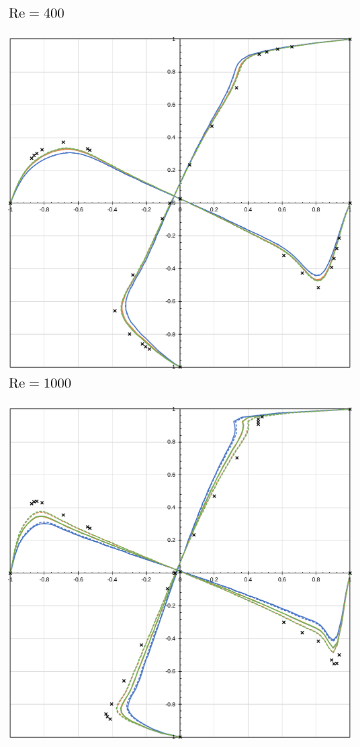 \begin{figure}[h!]
\begin{subfigure}{0.4\textwidth}
        \caption{$\mathrm{Re}=400$}
    \end{subfigure}
    \begin{subfigure}{0.4\textwidth}
        \includegraphics[width=\linewidth]{Figuras/Cavity/Re1000.pdf}
        \caption{$\mathrm{Re}=1000$}
    \end{subfigure}
    \begin{subfigure}{0.4\textwidth}
        \includegraphics[width=\linewidth]{Figuras/Cavity/Re5000.pdf}

\end{subfigure}
\end{figure}
